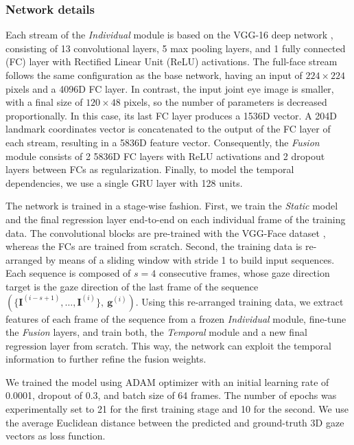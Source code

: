 \documentclass{bmvc2k}
\begin{document}
\subsubsection{Network details}
\label{sec:netdetails}

Each stream of the \textit{Individual} module is based on the VGG-16 deep network \cite{Parkhi15}, consisting of 13 convolutional layers, 5 max pooling layers, and 1 fully connected (FC) layer with Rectified Linear Unit (ReLU) activations. The full-face stream follows the same configuration as the base network, having an input of $224 \times 224$ pixels and a 4096D FC layer. In contrast, the input joint eye image is smaller, with a final size of $120 \times 48$ pixels, so the number of parameters is decreased proportionally. In this case, its last FC layer produces a 1536D vector. A 204D landmark coordinates vector is concatenated to the output of the FC layer of each stream, resulting in a 5836D feature vector. Consequently, the \textit{Fusion} module consists of 2 5836D FC layers with ReLU activations and 2 dropout layers between FCs as regularization. Finally, to model the temporal dependencies, we use a single GRU layer with 128 units.

The network is trained in a stage-wise fashion. First, we train the \textit{Static} model and the final regression layer end-to-end on each individual frame of the training data. The convolutional blocks are pre-trained with the VGG-Face dataset \cite{Parkhi15}, whereas the FCs are trained from scratch. Second, the training data is re-arranged by means of a sliding window with stride 1 to build input sequences. Each sequence is composed of $s = 4$ consecutive frames, whose gaze direction target is the gaze direction of the last frame of the sequence  $\left(\{\mathbf{I}^{(i-s+1)}, \dots, \mathbf{I}^{(i)} \}, \ \mathbf{g}^{(i)} \right) $. Using this re-arranged training data, we extract features of each frame of the sequence from a frozen \textit{Individual} module, fine-tune the \textit{Fusion} layers, and train both, the \textit{Temporal} module and a new final regression layer from scratch. This way, the network can exploit the temporal information to further refine the fusion weights.

We trained the model using ADAM optimizer with an initial learning rate of 0.0001, dropout of 0.3, and batch size of 64 frames. The number of epochs was experimentally set to 21 for the first training stage and 10 for the second. We use the average Euclidean distance between the predicted and ground-truth 3D gaze vectors as loss function. 
\end{document}
